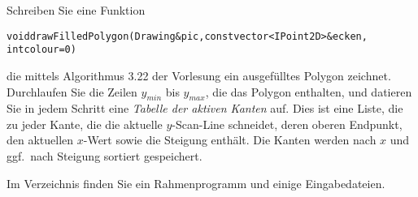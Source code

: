 \label{aufgabe:polygone}
%
Schreiben Sie eine Funktion
\begin{alltt}
   void drawFilledPolygon(Drawing& pic, const vector<IPoint2D>& ecken,
                          int colour = 0)
\end{alltt}
die mittels Algorithmus 3.22 der Vorlesung ein ausgefülltes Polygon 
zeichnet. Durchlaufen Sie die Zeilen $y_{min}$ bis $y_{max}$, die das 
Polygon enthalten, und datieren Sie in jedem Schritt eine 
\emph{Tabelle der aktiven Kanten} auf. Dies ist eine Liste, die zu jeder 
Kante, die die aktuelle $y$-Scan-Line schneidet, deren oberen Endpunkt, 
den aktuellen $x$-Wert sowie die Steigung enthält. Die Kanten werden 
nach $x$ und ggf.\ nach Steigung sortiert gespeichert.

Im Verzeichnis  finden Sie ein 
Rahmenprogramm und einige Eingabedateien.
